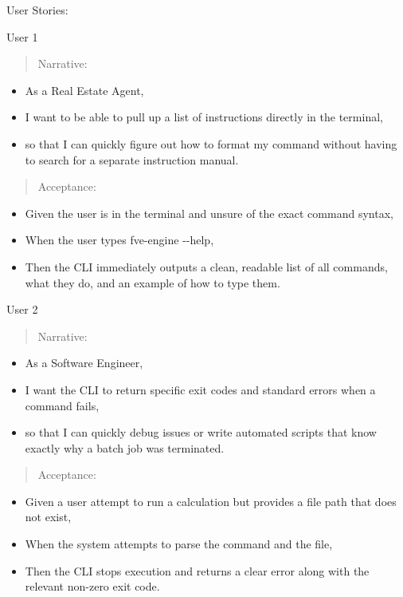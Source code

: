 User Stories:

User 1

\begin{quote}
Narrative:
\end{quote}

\begin{itemize}
\item
  As a Real Estate Agent,
\item
  I want to be able to pull up a list of instructions directly in the
  terminal,
\item
  so that I can quickly figure out how to format my command without
  having to search for a separate instruction manual.
\end{itemize}

\begin{quote}
Acceptance:
\end{quote}

\begin{itemize}
\item
  Given the user is in the terminal and unsure of the exact command
  syntax,
\item
  When the user types fve-engine -\/-help,
\item
  Then the CLI immediately outputs a clean, readable list of all
  commands, what they do, and an example of how to type them.
\end{itemize}

User 2

\begin{quote}
Narrative:
\end{quote}

\begin{itemize}
\item
  As a Software Engineer,
\item
  I want the CLI to return specific exit codes and standard errors when
  a command fails,
\item
  so that I can quickly debug issues or write automated scripts that
  know exactly why a batch job was terminated.
\end{itemize}

\begin{quote}
Acceptance:
\end{quote}

\begin{itemize}
\item
  Given a user attempt to run a calculation but provides a file path
  that does not exist,
\item
  When the system attempts to parse the command and the file,
\item
  Then the CLI stops execution and returns a clear error along with the
  relevant non-zero exit code.
\end{itemize}

